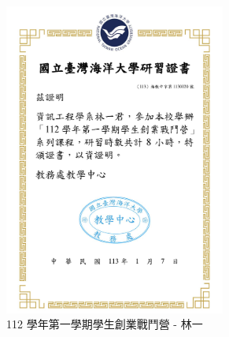 \begin{figure}[H]
  \centering
  \begin{subfigure}{0.32\linewidth}
    \centering
    \includegraphics[width=0.8\textwidth]{images/training-1.png}
    \caption{112 學年第一學期學生創業戰鬥營 - 林一}
    \label{fig:Training-1}
  \end{subfigure}
    \begin{subfigure}{0.32\linewidth}
    \centering

\end{subfigure}
\end{figure}
